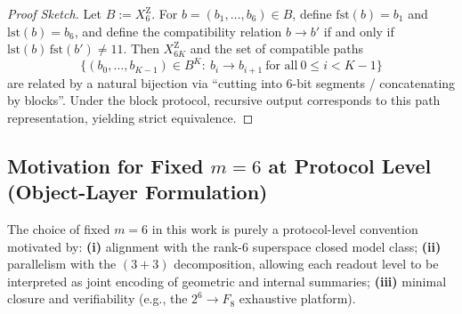 \begin{proof}[Proof Sketch]
Let $B:=X_6^{\mathrm Z}$. For $b=(b_1,\dots,b_6)\in B$, define $\mathrm{fst}(b)=b_1$ and $\mathrm{lst}(b)=b_6$, and define the compatibility relation $b\to b'$ if and only if $\mathrm{lst}(b)\,\mathrm{fst}(b')\neq 11$. Then $X_{6K}^{\mathrm Z}$ and the set of compatible paths
\[
\{(b_0,\dots,b_{K-1})\in B^K:\ b_i\to b_{i+1}\ \text{for all}\ 0\le i<K-1\}
\]
are related by a natural bijection via ``cutting into 6-bit segments / concatenating by blocks''. Under the block protocol, recursive output corresponds to this path representation, yielding strict equivalence.
\end{proof}

\subsection{Motivation for Fixed $m=6$ at Protocol Level (Object-Layer Formulation)}
The choice of fixed $m=6$ in this work is purely a protocol-level convention motivated by: \textbf{(i)} alignment with the rank-$6$ superspace closed model class; \textbf{(ii)} parallelism with the $(3+3)$ decomposition, allowing each readout level to be interpreted as joint encoding of geometric and internal summaries; \textbf{(iii)} minimal closure and verifiability (e.g., the $2^6\to F_8$ exhaustive platform).
